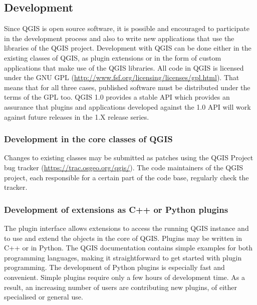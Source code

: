 \subsection{Development}


Since QGIS is open source software, it is possible and encouraged to participate
in the development
process and also to write new applications that use the libraries of the QGIS
project. Development with QGIS can be done either in the existing classes of
QGIS, as plugin extensions or in the form of custom applications that make use
of the QGIS libraries. All code in QGIS is licensed under the
GNU GPL (\url{http://www.fsf.org/licensing/licenses/gpl.html}). That means that
for all three cases, published software must be
distributed under the terms of the GPL too. QGIS 1.0 provides a stable API
which 
provides an assurance that plugins and applications developed against the 1.0
API will work against future releases in the 1.X release series.

\subsubsection{Development in the core classes of QGIS}
Changes to existing classes may be submitted as patches using the QGIS Project
bug
tracker (\url{https://trac.osgeo.org/qgis/}). The code maintainers of the QGIS
project, each responsible for a certain part of the code base, regularly check
the tracker.

\subsubsection{Development of extensions as C++ or Python plugins}
The plugin interface allows extensions to access the running QGIS
instance and to use and extend the objects in the core of QGIS. Plugins may be
written in C++ or in Python. The QGIS documentation contains simple examples
for both programming languages, making it straightforward to get started with
plugin 
programming. The development of Python plugins is especially fast and
convenient. Simple plugins require only a few hours of development time. As a
result,
an increasing number of users are contributing new plugins, of either
specialised or general use.

